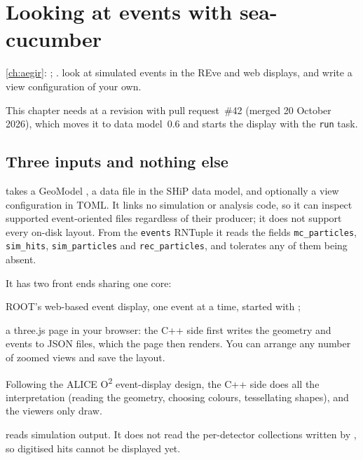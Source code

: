 \chapter{Looking at events with sea-cucumber}
\label{ch:display}

{\cref{ch:aegir}: ; .}
{look at simulated events in the REve and web displays, and write a view configuration of your own.}

\begin{organisernote}
This chapter needs  at a revision with pull request~\#42
(merged 20 October 2026), which moves it to data model~0.6 and starts the
display with the \texttt{run} task.
\end{organisernote}

\section{Three inputs and nothing else}

 takes a GeoModel , a data file in the SHiP data
model, and optionally a view configuration in TOML. It links no simulation or
analysis code, so it can inspect supported event-oriented files regardless of their producer;
it does not support every on-disk layout. From the \texttt{events} RNTuple it reads the fields
\texttt{mc\_particles}, \texttt{sim\_hits}, \texttt{sim\_particles} and
\texttt{rec\_particles}, and tolerates any of them being absent.

It has two front ends sharing one core:

\begin{description}[style=nextline]
  \item[the REve display] ROOT's web-based event display, one event at a
    time, started with ;
  \item[the web display] a three.js page in your browser: the C++ side
    first writes the geometry and events to JSON files, which the page then
    renders. You can arrange any number of zoomed views and save the layout.
\end{description}

Following the ALICE O\textsuperscript{2} event-display design, the C++ side
does all the interpretation (reading the geometry, choosing colours,
tessellating shapes), and the viewers only draw.

\begin{note}
 reads simulation output. It does not read the per-detector
collections written by , so digitised hits cannot be displayed
yet.
\end{note}

